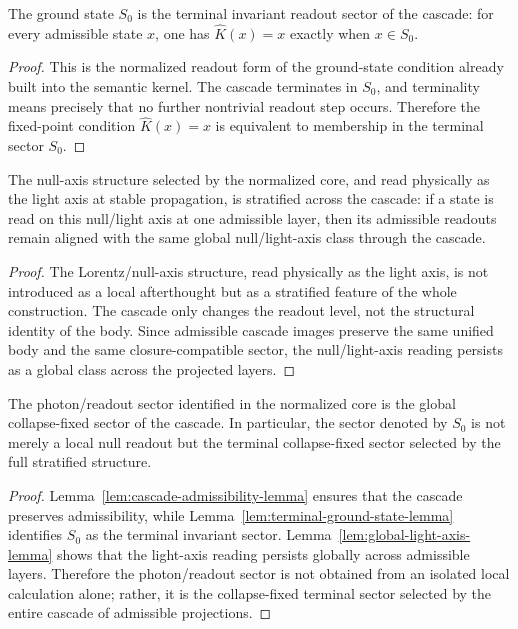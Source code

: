 \begin{lemma}
\label{lem:terminal-ground-state-lemma}
The ground state $S_0$ is the terminal invariant readout sector of the cascade:
for every admissible state $x$, one has $\hat K(x)=x$ exactly when $x\in S_0$.
\end{lemma}

\begin{proof}
This is the normalized readout form of the ground-state condition already built
into the semantic kernel. The cascade terminates in $S_0$, and terminality
means precisely that no further nontrivial readout step occurs. Therefore the
fixed-point condition $\hat K(x)=x$ is equivalent to membership in the terminal
sector $S_0$.
\end{proof}

\begin{lemma}
\label{lem:global-light-axis-lemma}
The null-axis structure selected by the normalized core, and read physically as the light axis at stable propagation, is stratified across
the cascade: if a state is read on this null/light axis at one admissible layer, then
its admissible readouts remain aligned with the same global null/light-axis class
through the cascade.
\end{lemma}

\begin{proof}
The Lorentz/null-axis structure, read physically as the light axis, is not introduced as a local afterthought but
as a stratified feature of the whole construction. The cascade only changes the
readout level, not the structural identity of the body. Since admissible
cascade images preserve the same unified body and the same closure-compatible
sector, the null/light-axis reading persists as a global class across the projected
layers.
\end{proof}

\begin{theorem}
\label{thm:collapse-fixed-sector-theorem}
The photon/readout sector identified in the normalized core is the global
collapse-fixed sector of the cascade. In particular, the sector denoted by
$S_0$ is not merely a local null readout but the terminal collapse-fixed sector
selected by the full stratified structure.
\end{theorem}

\begin{proof}
Lemma~\ref{lem:cascade-admissibility-lemma} ensures that the cascade preserves
admissibility, while Lemma~\ref{lem:terminal-ground-state-lemma} identifies
$S_0$ as the terminal invariant sector. Lemma~\ref{lem:global-light-axis-lemma}
shows that the light-axis reading persists globally across admissible layers.
Therefore the photon/readout sector is not obtained from an isolated local
calculation alone; rather, it is the collapse-fixed terminal sector selected by
the entire cascade of admissible projections.
\end{proof}

